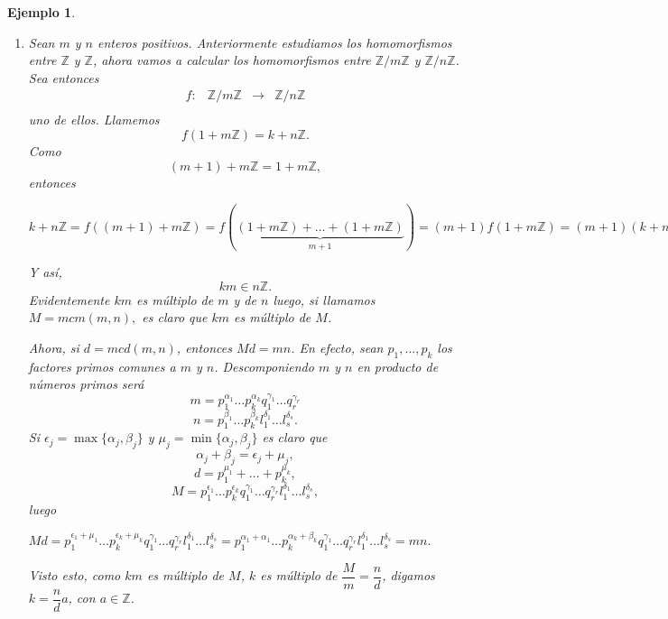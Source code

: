 \documentclass[12pt]{article}
\newtheorem{example}{Ejemplo}[theorem]
\begin{document}
\begin{example}
\begin{enumerate}
cumple $\det A = a1^{n-1} = a$, probando la sobreyectividad de $f$.

\item Sean $m$ y $n$ enteros positivos. Anteriormente estudiamos los homomorfismos entre $\mathbb{Z}$ y $\mathbb{Z}$, ahora vamos a calcular los homomorfismos entre $\mathbb{Z}/m\mathbb{Z}$ y $\mathbb{Z}/n\mathbb{Z}$. Sea entonces $$\begin{array}{rccl}
f\colon &\mathbb{Z}/m\mathbb{Z}& \longrightarrow &\mathbb{Z}/n\mathbb{Z}\\
\end{array}
$$ uno de ellos. Llamemos $$f(1 + m\mathbb{Z}) = k + n\mathbb{Z}.$$ Como $$(m+1)+m\mathbb{Z} = 1 + m\mathbb{Z},$$ entonces \begin{center}$k + n\mathbb{Z} = f((m+1)+m\mathbb{Z}) = f(\underbrace{(1 + m\mathbb{Z}) + \ldots + (1 + m\mathbb{Z})}_{m+1}) = (m+1)f(1 + m\mathbb{Z}) = (m+1)(k + n\mathbb{Z}) = k(m+1)+ n\mathbb{Z}.$\end{center} Y así, $$km \in n\mathbb{Z}.$$ Evidentemente $km$ es múltiplo de $m$ y de $n$ luego, si llamamos $M= mcm(m,n),$ es claro que $km$ es múltiplo de $M$. 

Ahora, si $d = mcd(m,n)$, entonces $Md=mn$. En efecto, sean $p_1, \ldots, p_k$ los factores primos comunes a $m$ y $n$. Descomponiendo $m$ y $n$ en producto de números primos será $$m = p_1^{\alpha_1} \ldots p_k^{\alpha_k}q_1^{\gamma_1}  \ldots q_r^{\gamma_r}$$ $$n = p_1^{\beta_1} \ldots p_k^{\beta_k}l_1^{\delta_1}  \ldots l_s^{\delta_s}.$$ Si $\epsilon_j = \max \lbrace \alpha_j, \beta_j \rbrace$ y $\mu_j = \min \lbrace \alpha_j, \beta_j \rbrace$ es claro que $$\alpha_j + \beta_j = \epsilon_j + \mu_j,$$ $$d = p_1^{\mu_1} + \ldots + p_k^{\mu_k},$$ $$M = p_1^{\epsilon_1} \ldots p_k^{\epsilon_k}q_1^{\gamma_1}\ldots q_r^{\gamma_r}l_1^{\delta_1} \ldots l_s^{\delta_s},$$ luego \begin{center}$Md = p_1^{\epsilon_1+\mu_1} \ldots p_k^{\epsilon_k+\mu_k}q_1^{\gamma_1}\ldots q_r^{\gamma_r}l_1^{\delta_1} \ldots l_s^{\delta_s} = p_1^{\alpha_1+\alpha_1} \ldots p_k^{\alpha_k+\beta_k}q_1^{\gamma_1}\ldots q_r^{\gamma_r}l_1^{\delta_1} \ldots l_s^{\delta_s} = mn.$\end{center}

Visto esto, como $km$ es múltiplo de $M$, $k$ es múltiplo de $\dfrac{M}{m} = \dfrac{n}{d}$, digamos $k = \dfrac{n}{d}a$, con $a \in \mathbb{Z}$.


\end{enumerate}
\end{example}
\end{document}
